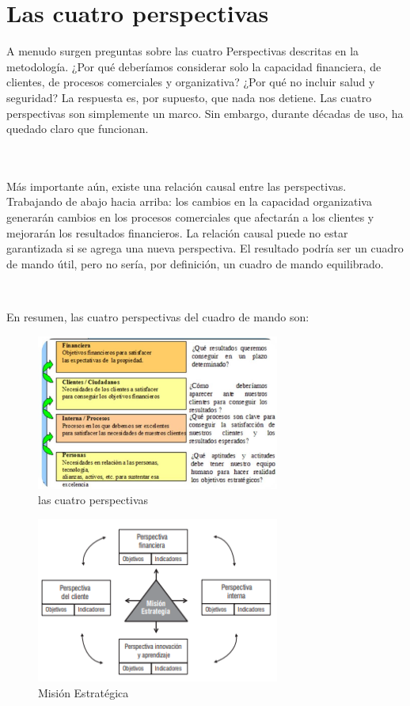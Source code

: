 \documentclass[a4paper,12pt,twocolumn]{article}
\begin{document}
\section*{Las cuatro perspectivas}
\item{A menudo surgen preguntas sobre las cuatro Perspectivas descritas en la metodología. ¿Por qué deberíamos considerar solo la capacidad financiera, de clientes, de procesos comerciales y organizativa? ¿Por qué no incluir salud y seguridad? La respuesta es, por supuesto, que nada nos detiene. Las cuatro perspectivas son simplemente un marco. Sin embargo, durante décadas de uso, ha quedado claro que funcionan.

\\
\textbf{}
\\
Más importante aún, existe una relación causal entre las perspectivas. Trabajando de abajo hacia arriba: los cambios en la capacidad organizativa generarán cambios en los procesos comerciales que afectarán a los clientes y mejorarán los resultados financieros. La relación causal puede no estar garantizada si se agrega una nueva perspectiva. El resultado podría ser un cuadro de mando útil, pero no sería, por definición, un cuadro de mando equilibrado.}
\\
\item{En resumen, las cuatro perspectivas del cuadro de mando son:}
\textbf{}

\begin{figure}[h!]
\centering
\includegraphics[width=8cm]{./Imagenes/img13}
\caption{\label{fig:01}las cuatro perspectivas}
\end{figure}

\begin{figure}[h!]
\centering
\includegraphics[width=8cm]{./Imagenes/img2}
\caption{\label{fig:01}Misión Estratégica}
\end{figure}
\end{document}

